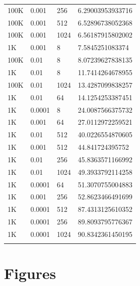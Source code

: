 \begin{table}[H]
\begin{tabular}{llll}
100K    & 0.001  & 256   & 6.29003953933716  \\ 
100K    & 0.001  & 512   & 6.52896738052368  \\ 
100K    & 0.001  & 1024  & 6.56187915802002  \\ 
1K      & 0.001  & 8     & 7.5845251083374   \\ 
100K    & 0.01   & 8     & 8.07239627838135  \\ 
1K      & 0.01   & 8     & 11.7414264678955  \\ 
100K    & 0.01   & 1024  & 13.4287099838257  \\ 
1K      & 0.01   & 64    & 14.1254253387451  \\ 
1K      & 0.0001 & 8     & 24.0087566375732  \\ 
1K      & 0.001  & 64    & 27.0112972259521  \\ 
1K      & 0.01   & 512   & 40.0226554870605  \\ 
1K      & 0.001  & 512   & 44.841724395752   \\ 
1K      & 0.01   & 256   & 45.8363571166992  \\ 
1K      & 0.01   & 1024  & 49.3933792114258  \\ 
1K      & 0.0001 & 64    & 51.3070755004883  \\ 
1K      & 0.001  & 256   & 52.8623466491699  \\ 
1K      & 0.0001 & 512   & 87.4313125610352  \\ 
1K      & 0.0001 & 256   & 89.8093795776367  \\ 
1K      & 0.0001 & 1024  & 90.8342361450195  \\ 
\bottomrule\\
\end{tabular}
\end{table}




\section{Figures}

